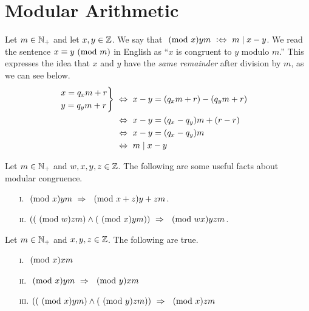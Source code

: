 \newpage

\section{Modular Arithmetic}

\begin{definition}
    Let $m \in \mathbb{N}_+$ and let $x, y \in \mathbb{Z}$.
    We say that $\modulo{x}{y}{m} \iffdefn m \divides x - y$.
    We read the sentence $\congruent{x}{y}{m}$ in English as
    ``$x$ is congruent to $y$ modulo $m$.''
    This expresses the idea that $x$ and $y$ have the \emph{same remainder}
    after division by $m$, as we can see below.
    \begin{align*}
        \begin{rcases}
            x = q_xm + r\\
            y = q_ym + r
        \end{rcases}
            &\iff x - y = \pn*{q_xm + r} - \pn*{q_ym + r} \\
            &\iff x - y = \pn*{q_x - q_y}m + (r - r) \\
            &\iff x - y = \pn*{q_x - q_y}m \\
            &\iff m \divides x - y
    \end{align*}
\end{definition}

\begin{exercise}
    Let $m \in \mathbb{N}_+$ and $w, x, y, z \in \mathbb{Z}$.
    The following are some useful facts about modular congruence.
    \begin{enumerate}
        \item[\textsc{i.}]
            $\modulo{x}{y}{m} \implies \modulo{x + z}{y + z}{m}$.
        \item[\textsc{ii.}]
            $\pn*{\pn*{\modulo{w}{z}{m}} \meet \pn*{\modulo{x}{y}{m}}}
                \implies \modulo{wx}{yz}{m}$.
    \end{enumerate}
\end{exercise}

\begin{theorem}
    Let $m \in \mathbb{N}_+$ and $x, y, z \in \mathbb{Z}$.
    The following are true.
    \begin{enumerate}
        \item[\textsc{i.}]
            $\modulo{x}{x}{m}$
        \item[\textsc{ii.}]
            $\modulo{x}{y}{m} \implies \modulo{y}{x}{m}$
        \item[\textsc{iii.}]
            $\pn*{\pn*{\modulo{x}{y}{m}} \meet \pn*{\modulo{y}{z}{m}}}
                \implies \modulo{x}{z}{m}$
    \end{enumerate}
\end{theorem}

